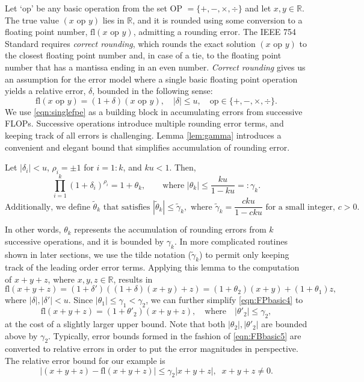 \documentclass[review,onefignum,onetabnum]{siamart190516}
\newcommand{\R}{\mathbb{R}}
\newcommand{\dd}{\delta}
\newcommand{\tth}{\theta}
\newcommand{\fl}{\mathrm{fl}}
\begin{document}
Let `op' be any basic operation from the set OP $=\{+, -, \times, \div\}$ and let $x,y\in \R$.
The true value $(x\text{ op }y)$ lies in $\R$, and it is rounded using some conversion to a floating point number, $\fl(x\text{ op }y)$, admitting a rounding error. 
The IEEE 754 Standard requires \emph{correct rounding}, which rounds the exact solution $(x\text{ op }y)$ to the closest floating point number and, in case of a tie, to the floating point number that has a mantissa ending in an even number.
\emph{Correct rounding} gives us an assumption for the error model where a single basic floating point operation yields a relative error, $\dd$, bounded in the following sense:
\begin{equation}
\fl(x\text{ op }y) = (1 + \dd)(x\text{ op }y),\quad |\dd|\leq u, \quad \text{op}\in\{+, -, \times, \div\}. \label{eqn:singlefpe}
\end{equation}
We use \cref{eqn:singlefpe} as a building block in accumulating errors from successive FLOPs.
Successive operations introduce multiple rounding error terms, and keeping track of all errors is challenging.
Lemma \ref{lem:gamma} introduces a convenient and elegant bound that simplifies accumulation of rounding error. 
\begin{lemma}
	\label{lem:gamma}
	Let $|\dd_i|<u$, $\rho_i =\pm 1$ for $i=1:k$, and $ku < 1$. Then, 
	\begin{equation}
	\prod_{i=1}^k (1+\dd_i)^{\rho_i} = 1 + \tth_{k},
	\qquad \mbox{where } |\tth_{k}|\leq \frac{ku}{1-ku}=:\gamma_{k}.
	\end{equation}
	$$\mbox{Additionally, we define $\tilde{\tth}_k$ that satisfies }|\tilde{\tth}_k| \leq \tilde{\gamma}_k,\mbox{ where } \tilde{\gamma}_{k} = \frac{cku}{1-cku} \mbox{ for a small integer, $c>0$.}$$
\end{lemma}
In other words, $\tth_{k}$ represents the accumulation of rounding errors from $k$ successive operations, and it is bounded by $\gamma_{k}$.
In more complicated routines shown in later sections, we use the tilde notation ($\tilde{\gamma}_k$) to permit only keeping track of the leading order error terms.
Applying this lemma to the computation of $x+y+z$, where $x,y,z\in\R$, results in
\begin{equation}
\fl(x+y+z) = (1+\dd')\left((1+\dd) (x+y) +z\right) = (1+\tth_{2})(x+y) + (1+\tth_{1})z, \label{eqn:FPbasic4}
\end{equation}
where $|\dd|,|\dd'|<u$. 
Since $|\tth_{1}| \leq \gamma_{1} < \gamma_{2}$, we can further simplify \cref{eqn:FPbasic4} to
\begin{equation}
\fl(x+y+z) = (1+\tth'_{2})(x+y+z), \quad \mbox{where} \quad |\tth'_{2}| \leq \gamma_{2}, \label{eqn:FBbasic5}
\end{equation}
at the cost of a slightly larger upper bound. 
Note that both $|\tth_2|,|\tth'_2|$ are bounded above by $\gamma_2$.
Typically, error bounds formed in the fashion of \cref{eqn:FBbasic5} are converted to relative errors in order to put the error magnitudes in perspective.
The relative error bound for our example is
\begin{equation*}
|(x+y+z) - \fl(x+y+z)|\leq \gamma_{2}|x+y+z|,\;\; x+y+z\neq 0.
\end{equation*}
\end{document}
